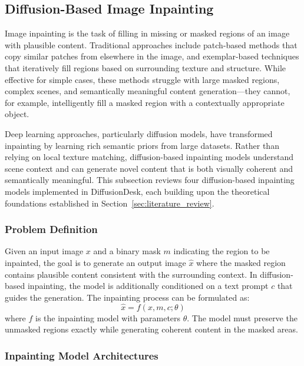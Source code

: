 \documentclass[12pt,a4paper]{report}
\begin{document}
\subsection{Diffusion-Based Image Inpainting}
\label{sec:diffusion_inpainting}

Image inpainting is the task of filling in missing or masked regions of an image with plausible content. Traditional approaches include patch-based methods that copy similar patches from elsewhere in the image, and exemplar-based techniques that iteratively fill regions based on surrounding texture and structure. While effective for simple cases, these methods struggle with large masked regions, complex scenes, and semantically meaningful content generation---they cannot, for example, intelligently fill a masked region with a contextually appropriate object.

Deep learning approaches, particularly diffusion models, have transformed inpainting by learning rich semantic priors from large datasets. Rather than relying on local texture matching, diffusion-based inpainting models understand scene context and can generate novel content that is both visually coherent and semantically meaningful. This subsection reviews four diffusion-based inpainting models implemented in DiffusionDesk, each building upon the theoretical foundations established in Section~\ref{sec:literature_review}.

\subsubsection{Problem Definition}

Given an input image $x$ and a binary mask $m$ indicating the region to be inpainted, the goal is to generate an output image $\hat{x}$ where the masked region contains plausible content consistent with the surrounding context. In diffusion-based inpainting, the model is additionally conditioned on a text prompt $c$ that guides the generation. The inpainting process can be formulated as:
\begin{equation}
\hat{x} = f(x, m, c; \theta)
\end{equation}
where $f$ is the inpainting model with parameters $\theta$. The model must preserve the unmasked regions exactly while generating coherent content in the masked areas.

\subsubsection{Inpainting Model Architectures}
\end{document}
